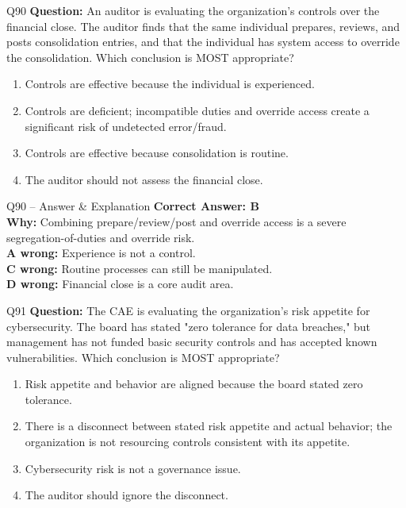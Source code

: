 \documentclass[aspectratio=169,10pt]{beamer}
\begin{document}
	\begin{frame}[t]{Q90}
		\small
		\textbf{Question:} An auditor is evaluating the organization's controls over the financial close. The auditor finds that the same individual prepares, reviews, and posts consolidation entries, and that the individual has system access to override the consolidation. Which conclusion is MOST appropriate?
		\begin{enumerate}[label=\Alph*.,itemsep=1pt,topsep=2pt]
			\item Controls are effective because the individual is experienced.
			\item Controls are deficient; incompatible duties and override access create a significant risk of undetected error/fraud.
			\item Controls are effective because consolidation is routine.
			\item The auditor should not assess the financial close.
		\end{enumerate}
	\end{frame}
	
	\begin{frame}[t]{Q90 -- Answer \& Explanation}
		\small
		\textbf{Correct Answer: B} \\[4pt]
		\textbf{Why:} Combining prepare/review/post and override access is a severe segregation-of-duties and override risk. \\[4pt]
		\textbf{A wrong:} Experience is not a control. \\[2pt]
		\textbf{C wrong:} Routine processes can still be manipulated. \\[2pt]
		\textbf{D wrong:} Financial close is a core audit area.
	\end{frame}
	
	\begin{frame}[t]{Q91}
		\small
		\textbf{Question:} The CAE is evaluating the organization's risk appetite for cybersecurity. The board has stated "zero tolerance for data breaches," but management has not funded basic security controls and has accepted known vulnerabilities. Which conclusion is MOST appropriate?
		\begin{enumerate}[label=\Alph*.,itemsep=1pt,topsep=2pt]
			\item Risk appetite and behavior are aligned because the board stated zero tolerance.
			\item There is a disconnect between stated risk appetite and actual behavior; the organization is not resourcing controls consistent with its appetite.
			\item Cybersecurity risk is not a governance issue.
			\item The auditor should ignore the disconnect.
		\end{enumerate}
	\end{frame}
	
\end{document}

